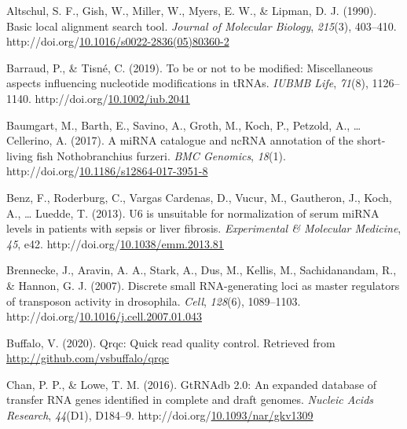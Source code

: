\documentclass[12pt,twoside]{reedthesis}
\newlength{\cslhangindent}
\newenvironment{CSLReferences}[2] %
 {%
  \setlength{\parindent}{0pt}
  \ifodd #1 \everypar{\setlength{\hangindent}{\cslhangindent}}\ignorespaces\fi
  \ifnum #2 > 0
  \setlength{\parskip}{#2\baselineskip}
  \fi
 }%
 {}
\begin{document}
\hypertarget{refs}{}
\begin{CSLReferences}{1}{0}
\leavevmode{}%
Altschul, S. F., Gish, W., Miller, W., Myers, E. W., \& Lipman, D. J. (1990). Basic local alignment search tool. \emph{Journal of Molecular Biology}, \emph{215}(3), 403--410. http://doi.org/\href{https://doi.org/10.1016/s0022-2836(05)80360-2}{10.1016/s0022-2836(05)80360-2}

\leavevmode{}%
Barraud, P., \& Tisné, C. (2019). To be or not to be modified: Miscellaneous aspects influencing nucleotide modifications in tRNAs. \emph{IUBMB Life}, \emph{71}(8), 1126--1140. http://doi.org/\href{https://doi.org/10.1002/iub.2041}{10.1002/iub.2041}

\leavevmode{}%
Baumgart, M., Barth, E., Savino, A., Groth, M., Koch, P., Petzold, A., \ldots{} Cellerino, A. (2017). A miRNA catalogue and ncRNA annotation of the short-living fish Nothobranchius furzeri. \emph{BMC Genomics}, \emph{18}(1). http://doi.org/\href{https://doi.org/10.1186/s12864-017-3951-8}{10.1186/s12864-017-3951-8}

\leavevmode{}%
Benz, F., Roderburg, C., Vargas Cardenas, D., Vucur, M., Gautheron, J., Koch, A., \ldots{} Luedde, T. (2013). U6 is unsuitable for normalization of serum miRNA levels in patients with sepsis or liver fibrosis. \emph{Experimental \& Molecular Medicine}, \emph{45}, e42. http://doi.org/\href{https://doi.org/10.1038/emm.2013.81}{10.1038/emm.2013.81}

\leavevmode{}%
Brennecke, J., Aravin, A. A., Stark, A., Dus, M., Kellis, M., Sachidanandam, R., \& Hannon, G. J. (2007). Discrete small RNA-generating loci as master regulators of transposon activity in drosophila. \emph{Cell}, \emph{128}(6), 1089--1103. http://doi.org/\href{https://doi.org/10.1016/j.cell.2007.01.043}{10.1016/j.cell.2007.01.043}

\leavevmode{}%
Buffalo, V. (2020). Qrqc: Quick read quality control. Retrieved from \url{http://github.com/vsbuffalo/qrqc}

\leavevmode{}%
Chan, P. P., \& Lowe, T. M. (2016). GtRNAdb 2.0: An expanded database of transfer RNA genes identified in complete and draft genomes. \emph{Nucleic Acids Research}, \emph{44}(D1), D184--9. http://doi.org/\href{https://doi.org/10.1093/nar/gkv1309}{10.1093/nar/gkv1309}


\end{CSLReferences}
\end{document}
